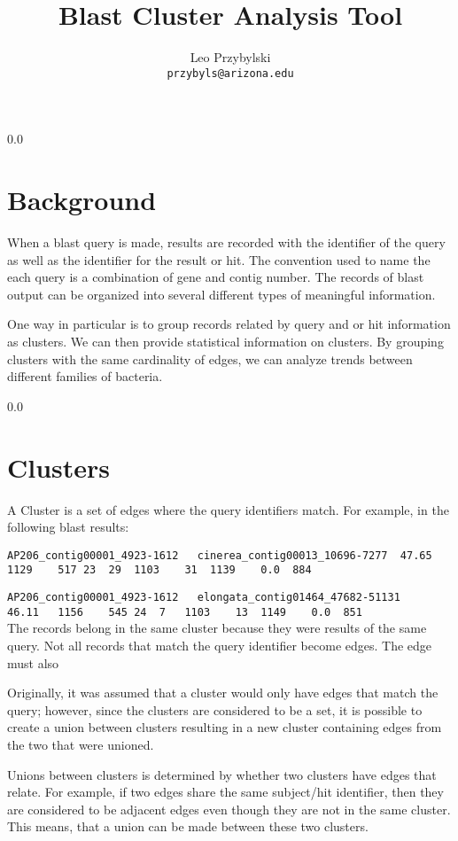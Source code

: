 \documentclass[11pt,notitlepage]{article}
\title{Blast Cluster Analysis Tool}
\author{Leo Przybylski\\
\texttt{przybyls@arizona.edu}}
\begin{document}
  \maketitle
  \tableofcontents

  \abstract{\ldots
}
  {\setlength{\baselineskip}%
           {0.0\baselineskip}
  \section*{\hfill Background}
  \hrulefill \par}
  When a blast query is made, results are recorded with the identifier of the query
  as well as the identifier for the result or hit. The convention used to name the
  each query is a combination of gene and contig number. The records of blast output
  can be organized into several different types of meaningful information.

  One way in particular is to group records related by query and or hit information as
  clusters. We can then provide statistical information on clusters. By grouping clusters
  with the same cardinality of edges, we can analyze trends between different families
  of bacteria.  

  {\setlength{\baselineskip}%
           {0.0\baselineskip}
  \section*{\hfill Clusters}
  \hrulefill \par}
  A Cluster is a set of edges where the query identifiers match. For example, in the
  following blast results:

  \noindent \verb|AP206_contig00001_4923-1612	cinerea_contig00013_10696-7277	47.65	1129	517	23	29	1103	31	1139	0.0	 884|

  \noindent \verb|AP206_contig00001_4923-1612	elongata_contig01464_47682-51131	46.11	1156	545	24	7	1103	13	1149	0.0	 851|
  \\

  The records belong in the same cluster because they were results of the same query. Not
  all records that match the query identifier become edges. The edge must also


  Originally,
  it was assumed that a cluster would only have edges that match the query; however, since
  the clusters are considered to be a set, it is possible to create a union between clusters 
  resulting in a new cluster containing edges from the two that were unioned.

  Unions between clusters is determined by whether two clusters have edges that relate. For example,
  if two edges share the same subject/hit identifier, then they are considered to be adjacent edges
  even though they are not in the same cluster. This means, that a union can be made between
  these two clusters.
\end{document}
